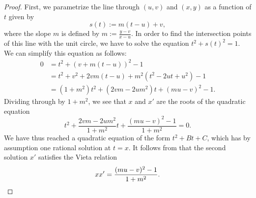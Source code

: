 \begin{proof}
  First, we parametrize the line through $(u,v)$ and $(x,y)$ as a function of $t$ given by
  \begin{equation*}
    s(t) := m(t-u)+v,
  \end{equation*}
  where the slope $m$ is defined by $m:=\tfrac{y-v}{x-u}$. In order to find the intersection points of this line with the unit circle, we have to solve the equation $t^2+s(t)^2=1$. We can simplify this equation as follows:
  \begin{align*}
    0 & = t^2 + (v+m(t-u))^2 - 1 \\
      & = t^2 + v^2 + 2vm(t-u) +m^2(t^2-2ut + u^2) -1 \\
      & = (1+m^2)t^2 + (2vm - 2um^2)t + (mu-v)^2 -1.
  \end{align*}
  Dividing through by $1+m^2$, we see that $x$ and $x'$ are the roots of the quadratic equation
  \begin{equation*}
    t^2 + \frac{2vm - 2um^2}{1+m^2}t + \frac{(mu-v)^2 -1}{1+m^2}=0.
  \end{equation*}
  We have thus reached a quadratic equation of the form $t^2+Bt+C$, which has by assumption one rational solution at $t=x$. It follows from  that the second solution $x'$ satisfies the Vieta relation
  \begin{equation*}
    xx' = \frac{(mu-v)^2 -1}{1+m^2}.\qedhere
  \end{equation*}
\end{proof}

